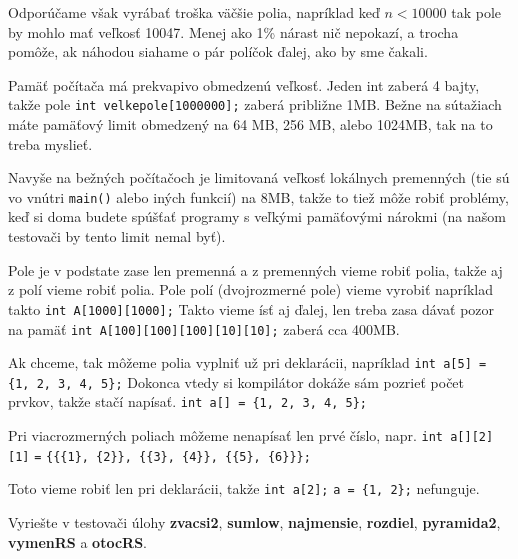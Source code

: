 Odporúčame však vyrábať troška väčšie polia, napríklad keď $n<10000$ tak pole
by mohlo mať veľkosť 10047. Menej ako 1\% nárast nič nepokazí, a trocha pomôže,
ak náhodou siahame o pár políčok ďalej, ako by sme čakali. 

Pamäť počítača má prekvapivo obmedzenú veľkosť. Jeden int zaberá 4 bajty, takže
pole \verb!int velkepole[1000000];! zaberá približne 1MB. Bežne na sútažiach
máte pamäťový limit obmedzený na 64 MB, 256 MB, alebo 1024MB, tak na to treba
myslieť.

Navyše na bežných počítačoch je limitovaná veľkosť lokálnych premenných (tie sú
vo vnútri \verb!main()! alebo iných funkcií) na 8MB, takže to tiež môže robiť
problémy, keď si doma budete spúšťať programy s veľkými pamäťovými nárokmi (na
našom testovači by tento limit nemal byť).

\medskip

Pole je v podstate zase len premenná a z premenných vieme robiť polia, takže aj
z polí vieme robiť polia. Pole polí (dvojrozmerné pole) vieme vyrobiť napríklad
takto \verb!int A[1000][1000];! Takto vieme ísť aj ďalej, len treba zasa dávať
pozor na pamäť \verb!int A[100][100][100][10][10];! zaberá cca 400MB.

\medskip

Ak chceme, tak môžeme polia vyplniť už pri deklarácii, napríklad 
\verb!int a[5] = {1, 2, 3, 4, 5};! Dokonca vtedy si kompilátor dokáže sám
pozrieť počet prvkov, takže stačí napísať. \verb!int a[] = {1, 2, 3, 4, 5};!

Pri viacrozmerných poliach môžeme nenapísať len prvé číslo, napr. 
\verb!int a[][2][1]! \verb!=! \verb!{{{1}, {2}}, {{3}, {4}}, {{5}, {6}}};!

Toto vieme robiť len pri deklarácii, takže \verb!int a[2];! \verb!a = {1, 2};!
nefunguje.

\medskip

Vyriešte v testovači úlohy \textbf{zvacsi2}, \textbf{sumlow},
\textbf{najmensie}, \textbf{rozdiel}, \textbf{pyramida2}, 
\textbf{vymenRS} a \textbf{otocRS}.




